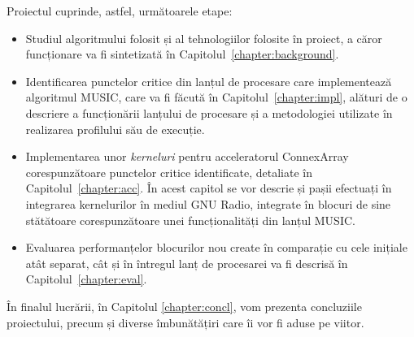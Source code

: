 Proiectul cuprinde, astfel, următoarele etape:
\begin{itemize}
  \item Studiul algoritmului folosit și al tehnologiilor folosite în proiect, a
  căror funcționare va fi sintetizată în Capitolul~\ref{chapter:background}.

  \item Identificarea punctelor critice din lanțul de procesare care
  implementează algoritmul MUSIC, care va fi făcută în
  Capitolul~\ref{chapter:impl}, alături de o descriere a funcționării lanțului
  de procesare și a metodologiei utilizate în realizarea profilului său de execuție.

  \item Implementarea unor \textit{kerneluri} pentru acceleratorul ConnexArray
  corespunzătoare punctelor critice identificate, detaliate în
  Capitolul~\ref{chapter:acc}. În acest capitol se vor descrie și pașii
  efectuați în integrarea kernelurilor în mediul GNU Radio, integrate în blocuri de sine
  stătătoare corespunzătoare unei funcționalități din lanțul {MUSIC}.

  \item Evaluarea performanțelor blocurilor nou create în comparație cu cele
  inițiale atât separat, cât și în întregul lanț de procesarei va fi descrisă în
  Capitolul~\ref{chapter:eval}.
\end{itemize}

În finalul lucrării, în Capitolul \ref{chapter:concl}, vom prezenta concluziile
proiectului, precum și diverse îmbunătățiri care îi vor fi aduse pe viitor.
